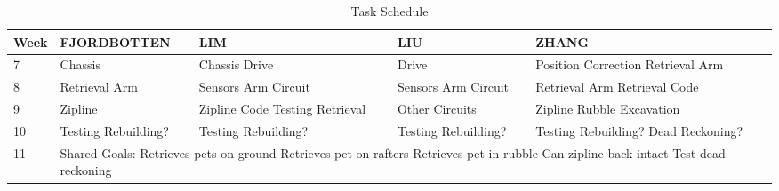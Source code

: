 \documentclass[11pt, oneside]{article} %
\begin{document}
\begin{table}[ht]
	\caption{Task Schedule}
	\centering
	\begin{tabular}{ | p{1.3cm} | p{3.5cm} | p{3cm} | p{3cm} | p{3.5cm} |} 
	\hline
	\textbf{Week} & \textbf{FJORDBOTTEN} & \textbf{LIM} & \textbf{LIU} & \textbf{ZHANG} \\ \hline 
	7& Chassis & Chassis \newline Drive & Drive & Position Correction \newline Retrieval Arm \\ \hline
	8& Retrieval Arm & Sensors \newline Arm Circuit & Sensors \newline Arm Circuit & Retrieval Arm \newline Retrieval Code \\ \hline
	9& Zipline & Zipline Code \newline Testing Retrieval & Other Circuits & Zipline \newline Rubble Excavation \\ \hline
	10& Testing \newline Rebuilding? & Testing \newline Rebuilding? & Testing \newline Rebuilding? & Testing \newline Rebuilding? \newline Dead Reckoning? \\ \hline
	11 \newline 12 \newline 13 &
	\multicolumn{4}{l|}{\parbox{10cm}{Shared Goals: \newline Retrieves pets on ground \newline Retrieves pet on rafters \newline Retrieves pet in rubble \newline Can zipline back intact \newline Test dead reckoning}} \\ \hline
	\end{tabular}
	\label{table:Task Schedule}
\end{table}

\clearpage

\end{document}
